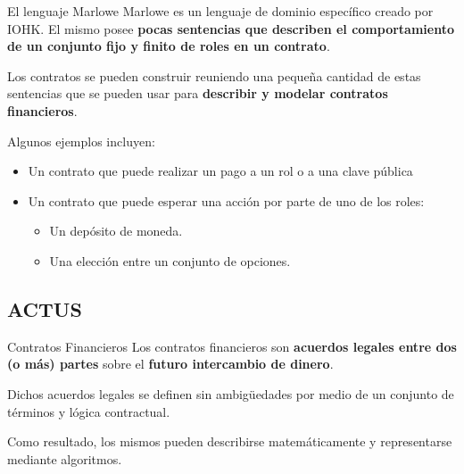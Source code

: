 \documentclass{beamer}
\begin{document}







\begin{frame}{El lenguaje Marlowe}
    Marlowe es un lenguaje de dominio específico creado por IOHK. El mismo posee \textbf{pocas sentencias que describen el comportamiento de un conjunto fijo y finito de roles en un contrato}.

\vfill
Los contratos se pueden construir reuniendo una pequeña cantidad de estas sentencias que se pueden usar para \textbf{describir y modelar contratos financieros}. 
\vfill

\pause
Algunos ejemplos incluyen:
\begin{itemize}
    \item Un contrato que puede realizar un pago a un rol o a una clave pública
    \item Un contrato que puede esperar una acción por parte de uno de los roles:
        \begin{itemize}
            \item Un depósito de moneda.
            \item Una elección entre un conjunto de opciones.
        \end{itemize}
\end{itemize}

\end{frame}



\subsection{ACTUS}

\begin{frame}{Contratos Financieros}
Los contratos financieros son \textbf{acuerdos legales entre dos (o más) partes} sobre el \textbf{futuro intercambio de dinero}. 

\vfill

Dichos acuerdos legales se definen sin ambigüedades por medio de un conjunto de términos y lógica contractual.

\pause
\vfill

Como resultado, los mismos pueden describirse matemáticamente y representarse mediante algoritmos.

\end{frame}
\end{document}
